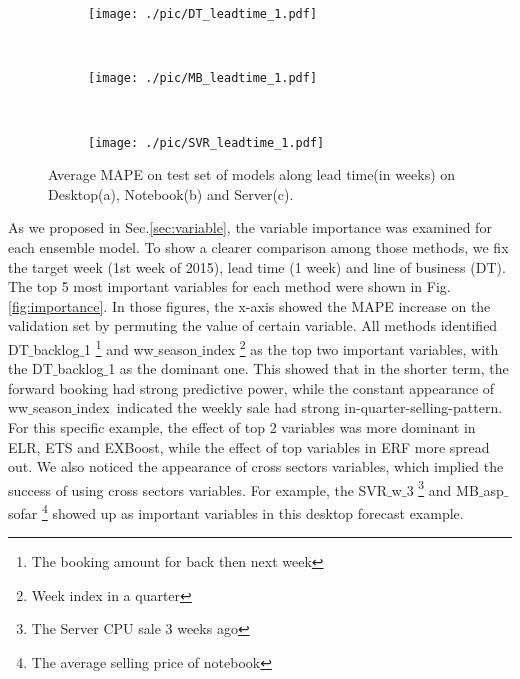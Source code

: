 \documentclass{llncs}
\begin{document}
\begin{figure}[ht]
\begin{subfigure}{0.32\textwidth}
    \texttt{[image: ./pic/DT\_leadtime\_1.pdf]}
    \caption{}
    \label{fig:DT_lead}
\end{subfigure}
~
\begin{subfigure}{0.32\textwidth}
    \texttt{[image: ./pic/MB\_leadtime\_1.pdf]}
    \caption{}
    \label{fig:MB_lead}
\end{subfigure}
~  
\begin{subfigure}{0.32\textwidth}
    \texttt{[image: ./pic/SVR\_leadtime\_1.pdf]}
    \caption{}
    \label{fig:SVR_lead}
\end{subfigure}
\caption{Average MAPE on test set of models along lead time(in weeks) on Desktop(a), Notebook(b) and Server(c).}
    \label{fig:CPU_lead}
\end{figure}


As we proposed in Sec.\ref{sec:variable}, the variable importance was examined for each ensemble model. To show a clearer comparison among those methods, we fix the target week (1st week of 2015), lead time (1 week) and line of business (DT). The top 5 most important variables for each method were shown in Fig.\ref{fig:importance}. In those figures, the x-axis showed the MAPE increase on the validation set by permuting the value of certain variable. All methods identified DT$\_$backlog$\_$1 \footnote{The booking amount for back then next week} and ww$\_$season$\_$index \footnote{Week index in a quarter} as the top two important variables, with the DT$\_$backlog$\_$1 as the dominant one. This showed that in the shorter term, the forward booking had strong predictive power, while the constant appearance of ww$\_$season$\_$index\ indicated the weekly sale had strong in-quarter-selling-pattern. For this specific example, the effect of top 2 variables was more dominant in ELR, ETS and EXBoost, while the effect of top variables in ERF more spread out. We also noticed the appearance of cross sectors variables, which implied the success of using cross sectors variables. For example, the SVR$\_$w$\_$3 \footnote{The Server CPU sale 3 weeks ago} and MB$\_$asp$\_$sofar \footnote{The average selling price of notebook} showed up as important variables in this desktop forecast example.
\end{document}
